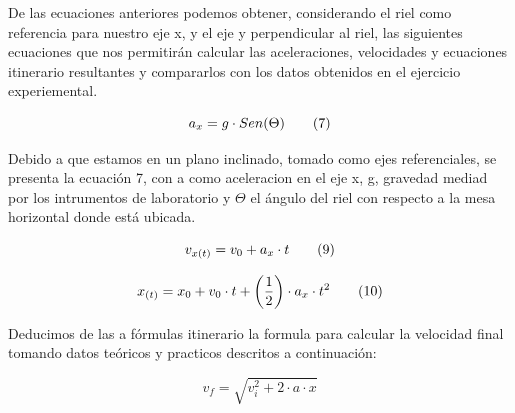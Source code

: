 \documentclass[twocolumn,12pt]{article}
\begin{document}
	\vspace{1cm}
	
	De las ecuaciones anteriores podemos obtener, considerando el riel como referencia para nuestro eje x, y el eje y perpendicular al riel, las siguientes ecuaciones que nos permitirán calcular las aceleraciones, velocidades y ecuaciones itinerario resultantes y compararlos con los datos obtenidos en el ejercicio experiemental.
	\vspace{-1cm}
	\begin{center}
	\begin{equation}
	\centering
	a_{x} = g \cdot Sen (\Theta) \tag*{(7)} 
	\end{equation}
	
	\vspace{-0.4cm}  
	
	\centering{}
	\end{center}
	
	Debido a que estamos en un plano inclinado, tomado como ejes referenciales, se presenta la ecuación 7, con a como aceleracion en el eje x, g, gravedad mediad por los intrumentos de laboratorio y $\Theta$ el ángulo del riel con respecto a la mesa horizontal donde está ubicada.
	\vspace{-0.5cm}
	\begin{center}
	\begin{equation}
	\centering
	v_{x(t)} = v_{0} + a_{x}\cdot t \tag*{(9)} 
	\end{equation}
	
	\vspace{-0.4cm}  
	
	\centering{}
	
		\begin{equation}
	\centering
	x_{(t)} = x_{0} + v_{0} \cdot t + \left( \frac{1}{2} \right) \cdot a_{x}\cdot t^{2} \tag*{(10)} 
	\end{equation}
	
	\vspace{-0.4cm}  
	
	\centering{}
	\end{center}

        Deducimos de las a fórmulas itinerario la formula para calcular la velocidad final tomando datos teóricos y practicos descritos a continuación:
	
	\[
	v_f = \sqrt{v_i^2 + 2 \cdot a \cdot x}
	\]
	
\end{document}
